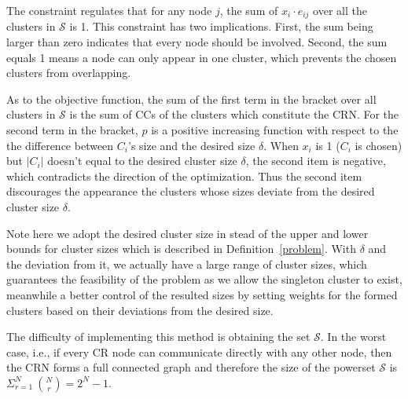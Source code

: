 \documentclass[times]{ettauth}
\newcommand{\ie}{i.e., }
\theoremstyle{mytheoremstyle}
\theoremstyle{mytheoremstyle}
\theoremstyle{mytheoremstyle}
\begin{document}
The constraint regulates that for any node $j$, the sum of $x_i\cdot e_{ij}$ over all the clusters in $\mathcal{S}$ is 1.
This constraint has two implications.
First, the sum being larger than zero indicates that every node should be involved.
Second, the sum equals 1 means a node can only appear in one cluster, which prevents the chosen clusters from overlapping.

As to the objective function, the sum of the first term in the bracket over all clusters in $\mathcal{S}$ is the sum of CCs of the clusters which constitute the CRN.
For the second term in the bracket, $p$ is a positive increasing function with respect to the the difference between $C_i$'s size and the desired size $\delta$.
When $x_i$ is 1 ($C_i$ is chosen) but $|C_i|$ doesn't equal to the desired cluster size $\delta$, the second item is negative, which contradicts the direction of the optimization.
Thus the second item discourages the appearance the clusters whose sizes deviate from the desired cluster size $\delta$.

Note here we adopt the desired cluster size in stead of the upper and lower bounds for cluster sizes which is described in Definition~\ref{problem}.
With $\delta$ and the deviation from it, we actually have a large range of cluster sizes, which guarantees the feasibility of the problem as we allow the singleton cluster to exist, meanwhile a better control of the resulted sizes by setting weights for the formed clusters based on their deviations from the desired size.


The difficulty of implementing this method is obtaining the set $\mathcal{S}$.
In the worst case, \ie if every CR node can communicate directly with any other node, then the CRN forms a full connected graph and therefore the size of the powerset $\mathcal{S}$ is $\Sigma_{r=1}^{N}\ {N \choose r} = 2^N-1$.
\end{document}
